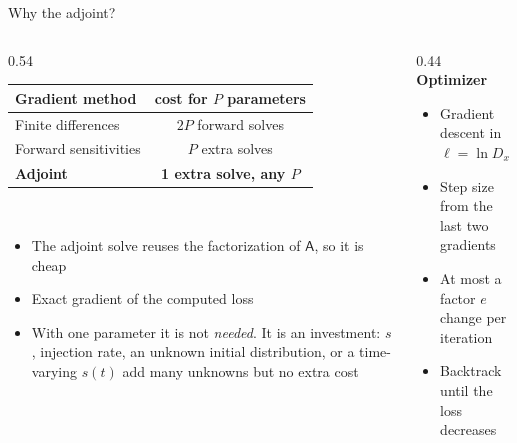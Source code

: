 \documentclass[aspectratio=169,10pt]{beamer}
\newcommand{\A}{\mathsf{A}}
\begin{document}
\begin{frame}{Why the adjoint?}
\begin{columns}[T]
\begin{column}{0.54\textwidth}
\small
\begin{tabular}{@{}lc@{}}
\toprule
Gradient method & cost for $P$ parameters\\\midrule
Finite differences & $2P$ forward solves\\
Forward sensitivities & $P$ extra solves\\
\textbf{Adjoint} & \textbf{1 extra solve, any $P$}\\\bottomrule
\end{tabular}\\[0.6em]
\normalsize
\begin{itemize}
\item The adjoint solve reuses the factorization of $\A$, so it is cheap
\item Exact gradient of the computed loss
\item With one parameter it is not \emph{needed}. It is an investment: $s$, injection rate, an unknown initial distribution, or a time-varying $s(t)$ add many unknowns but no extra cost
\end{itemize}
\end{column}
\begin{column}{0.44\textwidth}
\textbf{Optimizer}
\begin{itemize}
\item Gradient descent in $\ell = \ln D_x$
\item Step size from the last two gradients
\item At most a factor $e$ change per iteration
\item Backtrack until the loss decreases
\end{itemize}
\end{column}
\end{columns}
\end{frame}
\end{document}
